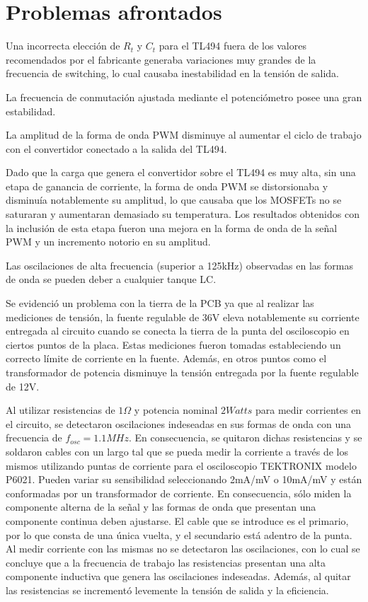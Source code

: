 \section{Problemas afrontados}

Una incorrecta elección de $R_t$ y $C_t$ para el TL494 fuera de los valores recomendados por el fabricante generaba variaciones muy grandes de la frecuencia de switching, 
lo cual causaba inestabilidad en la tensión de salida. 

La frecuencia de conmutación ajustada mediante el potenciómetro posee una gran estabilidad.

La amplitud de la forma de onda PWM disminuye al aumentar el ciclo de trabajo con el convertidor conectado a la salida del TL494. 

Dado que la carga que genera el convertidor sobre el TL494 es muy alta, sin una etapa de ganancia de corriente, la forma de onda PWM 
se distorsionaba y disminuía notablemente su amplitud, lo que causaba que los MOSFETs no se saturaran y aumentaran demasiado su temperatura.
Los resultados obtenidos con la inclusión de esta etapa fueron una mejora en la forma de onda de la señal PWM y un incremento notorio en su amplitud.

Las oscilaciones de alta frecuencia (superior a 125kHz) observadas en las formas de onda se pueden deber a cualquier tanque LC. 

Se evidenció un problema con la tierra de la PCB ya que al realizar las mediciones de tensión, la fuente regulable de 36V eleva notablemente su corriente entregada al circuito 
cuando se conecta la tierra de la punta del osciloscopio en ciertos puntos de la placa. 
Estas mediciones fueron tomadas estableciendo un correcto límite de corriente en la fuente. 
Además, en otros puntos como el transformador de potencia disminuye la tensión entregada por la fuente regulable de 12V. 

Al utilizar resistencias de $1\Omega$ y potencia nominal $2Watts$ para medir corrientes en el circuito, 
se detectaron oscilaciones indeseadas en sus formas de onda con una frecuencia de $f_{osc}=1.1MHz$. 
En consecuencia, se quitaron dichas resistencias y se soldaron cables con un largo tal que se pueda medir 
la corriente a través de los mismos utilizando puntas de corriente para el osciloscopio TEKTRONIX modelo P6021. 
Pueden variar su sensibilidad seleccionando 2mA/mV o 10mA/mV y están conformadas por un transformador de corriente.
En consecuencia, sólo miden la componente alterna de la señal y las formas de onda que presentan una componente continua deben ajustarse.
El cable que se introduce es el primario, por lo que consta de una única vuelta, y el secundario está adentro de la punta. 
Al medir corriente con las mismas no se detectaron las oscilaciones,
con lo cual se concluye que a la frecuencia de trabajo las resistencias presentan una alta componente inductiva que genera las oscilaciones indeseadas. 
Además, al quitar las resistencias se incrementó levemente la tensión de salida y la eficiencia. 

